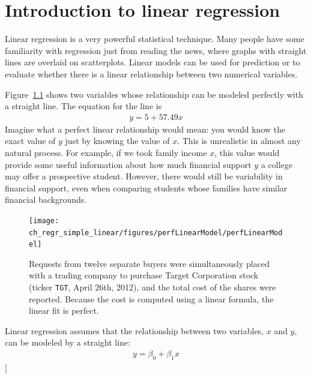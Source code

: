 \chapter{Introduction to linear regression}
\label{linRegrForTwoVar}


Linear regression is a very powerful statistical technique. Many people have some familiarity with regression just from reading the news, where graphs with straight lines are overlaid on scatterplots. Linear models can be used for prediction or to evaluate whether there is a linear relationship between two numerical variables.

Figure~\ref{perfLinearModel} shows two variables whose relationship can be modeled perfectly with a straight line. The equation for the line is
\begin{eqnarray*}
y = 5 + 57.49x
\end{eqnarray*}
Imagine what a perfect linear relationship would mean: you would know the exact value of $y$ just by knowing the value of $x$. This is unrealistic in almost any natural process. For example, if we took family income $x$, this value would provide some useful information about how much financial support $y$ a college may offer a prospective student. However, there would still be variability in financial support, even when comparing students whose families have similar financial backgrounds.

\begin{figure}
   \centering
   \texttt{[image: ch\_regr\_simple\_linear/figures/perfLinearModel/perfLinearModel]}
   \caption{Requests from twelve separate buyers were simultaneously placed with a trading company to purchase Target Corporation stock (ticker \texttt{TGT}, April 26th, 2012), and the total cost of the shares were reported. Because the cost is computed using a linear formula, the linear fit is perfect.}
   \label{perfLinearModel}
\end{figure}

Linear regression assumes that the relationship between two variables, $x$ and $y$, can be modeled by a straight line:
\begin{eqnarray}
y = \beta_0 + \beta_1x
\label{genLinModelWNoErrorTerm}
\end{eqnarray}
\marginpar[\raggedright\vspace{-10mm}


